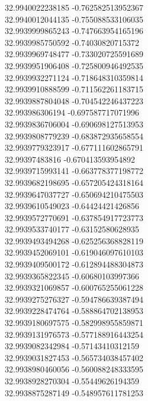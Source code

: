 {32.9940022238185	-0.762582513952367\\
32.9940012044135	-0.755088533106035\\
32.9939999865243	-0.747663954165196\\
32.9939985750592	-0.74030820715372\\
32.9939969748477	-0.733020725591689\\
32.9939951906408	-0.725800946492535\\
32.9939932271124	-0.718648310359814\\
32.9939910888599	-0.711562261183715\\
32.9939887804048	-0.704542246437223\\
32.993986306194	-0.697587717071996\\
32.9939836706004	-0.690698127513953\\
32.9939808779239	-0.683872935658554\\
32.9939779323917	-0.677111602865791\\
32.99397483816	-0.670413593954892\\
32.9939715993141	-0.663778377198772\\
32.9939682198695	-0.657205424318164\\
32.9939647037727	-0.650694210475503\\
32.9939610549023	-0.64424421426856\\
32.9939572770691	-0.637854917723773\\
32.9939533740177	-0.63152580628935\\
32.9939493494268	-0.625256368828119\\
32.9939452069101	-0.619046097610103\\
32.9939409500172	-0.612894488304873\\
32.9939365822345	-0.60680103997366\\
32.9939321069857	-0.600765255061228\\
32.9939275276327	-0.594786639387494\\
32.9939228474764	-0.588864702138953\\
32.9939180697575	-0.582998955859871\\
32.9939131976573	-0.577188916443254\\
32.9939082342984	-0.57143410312159\\
32.9939031827453	-0.565734038457402\\
32.9938980460056	-0.560088248333595\\
32.9938928270304	-0.55449626194359\\
32.9938875287149	-0.548957611781253\\
}
